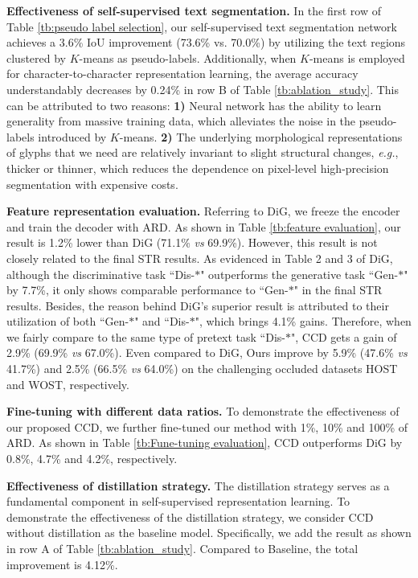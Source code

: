 \documentclass[10pt,twocolumn,letterpaper]{article}
\begin{document}
\noindent \textbf{Effectiveness of self-supervised text segmentation.}
In the first row of Table \ref{tb:pseudo label selection}, our self-supervised text segmentation network achieves a 3.6\% IoU improvement (73.6\% vs. 70.0\%) by utilizing the text regions clustered by $K$-means as pseudo-labels. Additionally, when $K$-means is employed for character-to-character representation learning, the average accuracy understandably decreases by 0.24\% in row B of Table \ref{tb:ablation_study}.
This can be attributed to two reasons:
\textbf{1)} Neural network has the ability to learn generality from massive training data, which alleviates the noise in the pseudo-labels introduced by $K$-means. \textbf{2)} The underlying morphological representations of glyphs that we need are relatively invariant to slight structural changes, \emph{e.g.}, thicker or thinner, which reduces the dependence on pixel-level high-precision segmentation with expensive costs. 

\noindent \textbf{Feature representation evaluation.}
Referring to DiG, we freeze the encoder and train the decoder with ARD. As shown in Table \ref{tb:feature evaluation}, our result is 1.2\% lower than DiG (71.1\% \emph{vs} 69.9\%). However, this result is not closely related to the final STR results. As evidenced in Table 2 and 3 of DiG, although the discriminative task ``Dis-$\ast$" outperforms the generative task ``Gen-$\ast$" by 7.7\%, it only shows comparable performance to ``Gen-$\ast$" in the final STR results. Besides, the reason behind DiG's superior result is attributed to their utilization of both ``Gen-$\ast$" and ``Dis-$\ast$", which brings 4.1\% gains. Therefore, when we fairly compare to the same type of pretext task ``Dis-$\ast$",  CCD gets a gain of 2.9\% (69.9\% \emph{vs} 67.0\%). Even compared to DiG, Ours improve by 5.9\% (47.6\% \emph{vs} 41.7\%) and 2.5\% (66.5\% \emph{vs} 64.0\%) on the challenging occluded datasets HOST and WOST, respectively.

\noindent \textbf{Fine-tuning with different data ratios.}
To demonstrate the effectiveness of our proposed CCD, we further fine-tuned our method with 1\%, 10\% and 100\% of ARD. As shown in Table \ref{tb:Fune-tuning evaluation}, CCD outperforms DiG by 0.8\%, 4.7\% and 4.2\%, respectively.

\noindent \textbf{Effectiveness of distillation strategy.} 
The distillation strategy serves as a fundamental component in self-supervised representation learning.
To demonstrate the effectiveness of the distillation strategy, we consider CCD without distillation as the baseline model. Specifically, we add the result as shown in row A of Table \ref{tb:ablation_study}. Compared to Baseline, the total improvement is 4.12\%.
\end{document}
